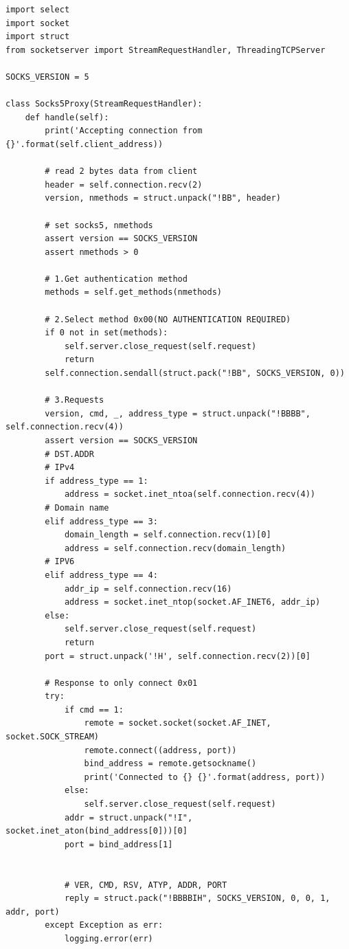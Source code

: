 \documentclass[11pt]{article}
\begin{document}
\begin{lstlisting}
import select
import socket
import struct
from socketserver import StreamRequestHandler, ThreadingTCPServer

SOCKS_VERSION = 5

class Socks5Proxy(StreamRequestHandler):
    def handle(self):
        print('Accepting connection from {}'.format(self.client_address))

        # read 2 bytes data from client
        header = self.connection.recv(2)
        version, nmethods = struct.unpack("!BB", header)
        
        # set socks5, nmethods
        assert version == SOCKS_VERSION
        assert nmethods > 0

        # 1.Get authentication method
        methods = self.get_methods(nmethods)
        
        # 2.Select method 0x00(NO AUTHENTICATION REQUIRED)
        if 0 not in set(methods):
            self.server.close_request(self.request)
            return
        self.connection.sendall(struct.pack("!BB", SOCKS_VERSION, 0))

        # 3.Requests
        version, cmd, _, address_type = struct.unpack("!BBBB", self.connection.recv(4))
        assert version == SOCKS_VERSION
        # DST.ADDR 
        # IPv4
        if address_type == 1:  
            address = socket.inet_ntoa(self.connection.recv(4))
        # Domain name       
        elif address_type == 3:  
            domain_length = self.connection.recv(1)[0]
            address = self.connection.recv(domain_length)
        # IPV6
        elif address_type == 4:  
            addr_ip = self.connection.recv(16)
            address = socket.inet_ntop(socket.AF_INET6, addr_ip)
        else:
            self.server.close_request(self.request)
            return
        port = struct.unpack('!H', self.connection.recv(2))[0]

        # Response to only connect 0x01
        try:
            if cmd == 1: 
                remote = socket.socket(socket.AF_INET, socket.SOCK_STREAM)
                remote.connect((address, port))
                bind_address = remote.getsockname()
                print('Connected to {} {}'.format(address, port))
            else:
                self.server.close_request(self.request)
            addr = struct.unpack("!I", socket.inet_aton(bind_address[0]))[0]
            port = bind_address[1]

          
		    # VER, CMD, RSV, ATYP, ADDR, PORT
            reply = struct.pack("!BBBBIH", SOCKS_VERSION, 0, 0, 1, addr, port)
        except Exception as err:
            logging.error(err)


\end{lstlisting}
\end{document}
